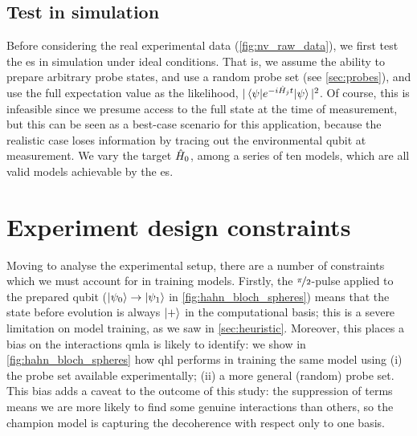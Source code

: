 \par 
\subsection{Test in simulation}
Before considering the real experimental data (\cref{fig:nv_raw_data}), 
    we first test the \gls{es} in simulation under ideal conditions. 
That is, we assume the ability to prepare arbitrary \gls{probe} states, 
    and use a random \gls{probe} set (see \cref{sec:probes}),
    and use the full expectation value as the likelihood, $|\braket{\psi | e^{-i \hat{H}_j t} | \psi}|^2$.
Of course, this is infeasible since we presume access to the full state at the time of measurement, 
    but this can be seen as a best-case scenario for this application, 
    because the realistic case loses information by tracing out the environmental qubit at measurement.
We vary the target $\hat{H}_0$, among a series of ten models,
    which are all valid models achievable by the \gls{es}. 


\section{Experiment design constraints}
Moving to analyse the experimental setup, there are a number of constraints which we must account for in 
    training models. 
Firstly, the $\nicefrac{\pi}{2}$-pulse applied to the prepared qubit ($\ket{\psi_0} \rightarrow \ket{\psi_1}$ in \cref{fig:hahn_bloch_spheres})
    means that the state before evolution is always $\ket{+}$ in the computational basis;
    this is a severe limitation on model training, as we saw in \cref{sec:heuristic}. 
Moreover, this places a bias on the interactions \gls{qmla} is likely to identify:
    we show in \cref{fig:hahn_bloch_spheres} how \gls{qhl} performs in training the same model using 
    (i) the \gls{probe} set available experimentally; (ii) a more general (random) \gls{probe} set. 
This bias adds a caveat to the outcome of this study:
    the suppression of terms means we are more likely to find some genuine interactions than others, 
    so the \gls{champion model} is capturing the decoherence with respect only to one basis.
\par

